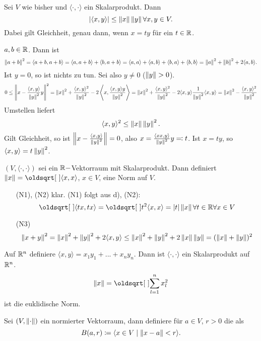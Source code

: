 \begin{lemma}
	Sei $ V $ wie bisher und $ \langle\cdot, \cdot\rangle $ ein Skalarprodukt. Dann
	\[ |\langle x,y\rangle|\leq\left\|x\right\|\left\|y\right\|\forall x,y\in V. \]
	Dabei gilt Gleichheit, genau dann, wenn $ x=ty $ f\"ur ein $ t\in\mathbb{R} $.
\end{lemma}
\begin{beweis}
	$ a,b\in\mathbb{R} $. Dann ist \[ \left\|a+b\right\|^2=\langle a+b,a+b\rangle=\langle a,a+b\rangle+\langle b,a+b\rangle=\langle a,a\rangle+\langle a,b\rangle+\langle b,a\rangle+\langle b,b\rangle=\left\|a\right\|^2+\left\|b\right\|^2+2\langle a,b\rangle. \]
	Ist $ y=0 $, so ist nichts zu tun. Sei also $ y\neq 0 $ ($ \norm{y}>0 $).
	\[ 0\leq\left\|x-\frac{\langle x,y\rangle}{\left\|y\right\|^2}y\right\|^2=\left\|x\right\|^2+\frac{\langle x,y\rangle^2}{\left\|y\right\|^2}-2\left\langle x,\frac{\langle x,y\rangle y}{\left\|y\right\|^2}\right\rangle=\left\|x\right\|^2+\frac{\langle x,y\rangle^2}{\left\|y\right\|^2}-2\langle x,y\rangle\frac{1}{\left\|y\right\|^2}\langle x,y\rangle=\left\|x\right\|^2-\frac{\langle x,y\rangle^2}{\left\|y\right\|^2} \]
	Umstellen liefert
	\[ \langle x,y\rangle^2\leq\left\|x\right\|\left\|y\right\|^2. \]
	Gilt Gleichheit, so ist $ \left\|x-\frac{\langle x,y\rangle}{\left\|y\right\|^2}\right\|=0 $, also $ x=\frac{\langle xx,y\rangle}{\left\|y\right\|^2}y\eqqcolon t $. Ist $ x=ty $, so $ \langle x,y\rangle=t\left\|y\right\|^2 $.
\end{beweis}
\begin{lemma}
	$ (V,\langle\cdot,\cdot\rangle) $ sei ein $ \mathbb{R}- $Vektorraum mit Skalarprodukt. Dann definiert $ \norm{x}=\sqrt{\langle x,x\rangle} $, $ x\in V $, eine Norm auf $ V $.
\end{lemma}
\begin{beweis}
	\begin{enumerate}
		\item[(N1), (N2)] klar. (N1) folgt aus d), (N2):
		\[ \sqrt{\langle tx, tx\rangle}=\sqrt{t^2\langle x,x\rangle}=|t|\norm{x}\forall t\in\R\forall x\in V \]
	    \item[(N3)] \[ \left\|x+y\right\|^2=\left\|x\right\|^2+\left\|y\right\|^2+2\langle x,y\rangle\leq\left\|x\right\|^2+\left\|y\right\|^2+2\left\|x\right\|\left\|y\right\|=(\left\|x\right\|+\left\|y\right\|)^2 \]
	\end{enumerate}
\end{beweis}
\begin{beispiel*}
	Auf $ \mathbb{R}^n $ definiere $ \langle x,y\rangle=x_1y_1+...+x_ny_n $. Dann ist $ \langle\cdot, \cdot\rangle $ ein Skalarprodukt auf $ \mathbb{R}^n $.
	\[ \norm{x}=\sqrt{\sum_{l=1}^{n}x^2_l} \]
	ist die euklidische Norm.
\end{beispiel*}
\begin{definition}
	Sei $ (V,\left\|\cdot\right\|) $ ein normierter Vektorraum, dann definiere f\"ur $ a\in V $, $ r>0 $ die  als
	\[ B(a,r)\coloneqq\langle x\in V\mid\left\|x-a\right\|<r\rangle. \]
\end{definition}
